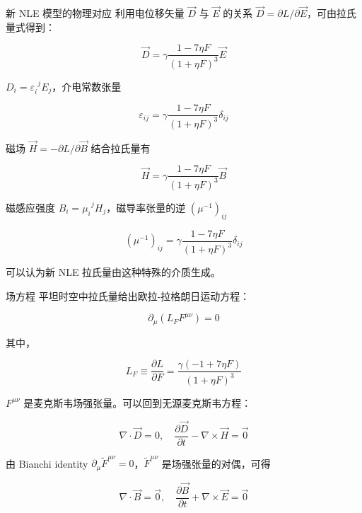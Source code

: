 \documentclass[9pt, dvipsnames]{beamer} %
\begin{document}
\begin{frame}{新 NLE 模型的物理对应}
利用电位移矢量 $\vec{D} $ 与 $\vec{E} $ 的关系 $\vec{D}=\partial L/\partial \vec{E} $，可由拉氏量式得到：

$$
\vec{D}
=\gamma\frac{1-7\eta F }{(1+\eta F)^3 } \vec{E}
$$

$D_i = \varepsilon_i^{~~ j } E_j $，介电常数张量

$$
\boxed{
\varepsilon_{ij} = \gamma \frac{1-7\eta F }{(1+\eta F)^3 }\delta_{ij}
}
$$

磁场 $\vec{H}=-\partial L/\partial \vec{B} $ 结合拉氏量有

$$
\vec{H}
=\gamma \frac{1-7\eta F }{(1+\eta F)^3 } \vec{B}
$$

磁感应强度 $B_i=\mu_i^{~~j}H_j $，磁导率张量的逆 $\left(\mu^{-1} \right)_{ij} $

$$
\boxed{
\left(\mu^{-1} \right)_{ij}
=\gamma \frac{1-7\eta F }{(1+\eta F)^3 } \delta_{ij}
}
$$

可以认为新 NLE 拉氏量由这种特殊的介质生成。
\end{frame}

\begin{frame}{场方程}
    平坦时空中拉氏量给出欧拉-拉格朗日运动方程：

    $$
    \partial_\mu\left(L_F F^{\mu\nu} \right) = 0
    $$
    
    其中，
    
    $$
    L_F
    \equiv \frac{\partial L }{\partial F } 
    =\frac{\gamma(-1+7\eta F) }{(1+\eta F)^3 }
    $$
    
    $F^{\mu \nu} $ 是麦克斯韦场强张量。可以回到无源麦克斯韦方程：

    $$
    \boxed{
    \nabla\cdot\vec{D} = 0,\quad
    \frac{\partial \vec{D} }{\partial t } - \nabla\times\vec{H}= \vec{0}
    }
    $$
    
    由 Bianchi identity $\partial_\mu \tilde{F}^{\mu \nu}=0 $，$\tilde{F}^{\mu\nu} $ 是场强张量的对偶，可得
    
    $$
    \boxed{
    \nabla\cdot\vec{B} = \vec{0},\quad 
    \frac{\partial \vec{B} }{\partial t } + \nabla\times\vec{E} = \vec{0}
    }
    $$
\end{frame}
\end{document}
